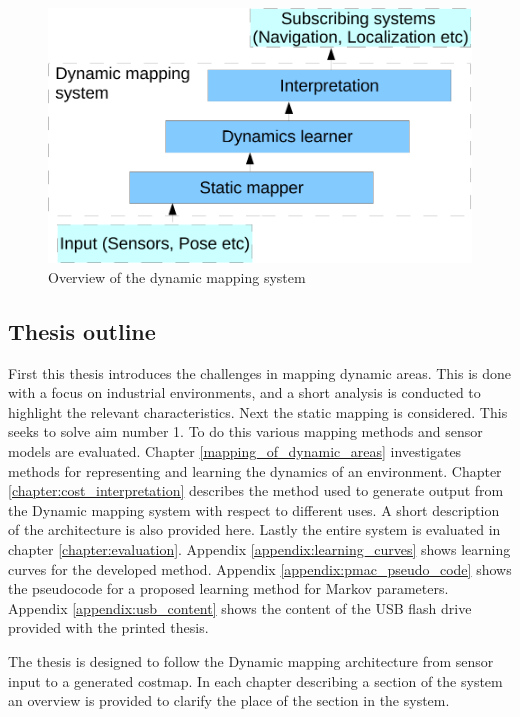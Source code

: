 \begin{figure} [htbp]
	\centering
	\includegraphics[scale=0.7]{chapters/introduction/figures/system-overview}
	\caption{Overview of the dynamic mapping system}
	\label{fig:block-overview}
\end{figure}

\subsection{Thesis outline}
First this thesis introduces the challenges in mapping dynamic areas. This is done with a focus on industrial environments, and a short analysis is conducted to highlight the relevant characteristics.
Next the static mapping is considered. 
This seeks to solve aim number 1. 
To do this various mapping methods and sensor models are evaluated.
Chapter \ref{mapping_of_dynamic_areas} investigates methods for representing and learning the dynamics of an environment. 
Chapter \ref{chapter:cost_interpretation} describes the method used to generate output from the Dynamic mapping system with respect to different uses. 
A short description of the architecture is also provided here. 
Lastly the entire system is evaluated in chapter \ref{chapter:evaluation}.
Appendix \ref{appendix:learning_curves} shows learning curves for the developed method.
Appendix \ref{appendix:pmac_pseudo_code} shows the pseudocode for a proposed learning method for Markov parameters.
Appendix \ref{appendix:usb_content} shows the content of the USB flash drive provided with the printed thesis. 

The thesis is designed to follow the Dynamic mapping architecture from sensor input to a generated costmap. 
In each chapter describing a section of the system an overview is provided to clarify the place of the section in the system. 

